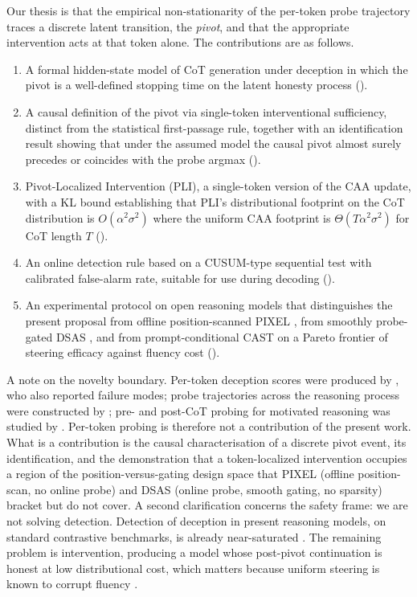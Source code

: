 \documentclass[11pt]{article}
\theoremstyle{definition}
\newcommand{\1}{\mathbf{1}}
\begin{document}
Our thesis is that the empirical non-stationarity of the per-token probe trajectory traces a discrete latent transition, the \emph{pivot}, and that the appropriate intervention acts at that token alone. The contributions are as follows.

\begin{enumerate}[leftmargin=1.4em,itemsep=0.15em]
\item A formal hidden-state model of CoT generation under deception in which the pivot is a well-defined stopping time on the latent honesty process ().
\item A causal definition of the pivot via single-token interventional sufficiency, distinct from the statistical first-passage rule, together with an identification result showing that under the assumed model the causal pivot almost surely precedes or coincides with the probe argmax ().
\item Pivot-Localized Intervention (PLI), a single-token version of the CAA update, with a KL bound establishing that PLI's distributional footprint on the CoT distribution is $O(\alpha^2 \sigma^2)$ where the uniform CAA footprint is $\Theta(T \alpha^2 \sigma^2)$ for CoT length $T$ ().
\item An online detection rule based on a CUSUM-type sequential test with calibrated false-alarm rate, suitable for use during decoding ().
\item An experimental protocol on open reasoning models that distinguishes the present proposal from offline position-scanned PIXEL \citep{yu2025pixel}, from smoothly probe-gated DSAS \citep{ferrando2025dsas}, and from prompt-conditional CAST \citep{lee2024cast} on a Pareto frontier of steering efficacy against fluency cost ().
\end{enumerate}

A note on the novelty boundary. Per-token deception scores were produced by \citet{goldowsky2025deception}, who also reported failure modes; probe trajectories across the reasoning process were constructed by \citet{chrabaszcz2026monologue}; pre- and post-CoT probing for motivated reasoning was studied by \citet{mirtaheri2026rationalization}. Per-token probing is therefore not a contribution of the present work. What is a contribution is the causal characterisation of a discrete pivot event, its identification, and the demonstration that a token-localized intervention occupies a region of the position-versus-gating design space that PIXEL (offline position-scan, no online probe) and DSAS (online probe, smooth gating, no sparsity) bracket but do not cover. A second clarification concerns the safety frame: we are not solving detection. Detection of deception in present reasoning models, on standard contrastive benchmarks, is already near-saturated \citep{goldowsky2025deception}. The remaining problem is intervention, producing a model whose post-pivot continuation is honest at low distributional cost, which matters because uniform steering is known to corrupt fluency \citep{pres2024reliable}.
\end{document}
